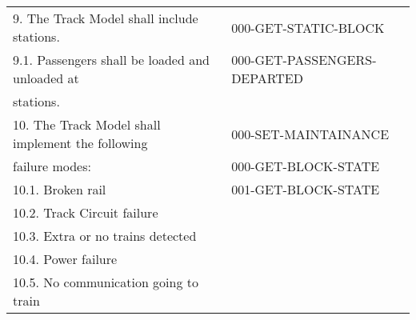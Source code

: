 \documentclass{scrreprt}
\begin{document}
\begin{center}
{\begin{tabular}{ l | l }
	9. The Track Model shall include stations. & 000-GET-STATIC-BLOCK \\
	9.1. Passengers shall be loaded and unloaded at & 000-GET-PASSENGERS-DEPARTED \\
	     stations. & \\ \hline
	10. The Track Model shall implement the following & 000-SET-MAINTAINANCE \\
	    failure modes: & 000-GET-BLOCK-STATE \\
	10.1. Broken rail & 001-GET-BLOCK-STATE \\
	10.2. Track Circuit failure & \\
	10.3. Extra or no trains detected & \\
	10.4. Power failure & \\
	10.5. No communication going to train & \\
  \end{tabular}
}
\end{center}
\end{document}
